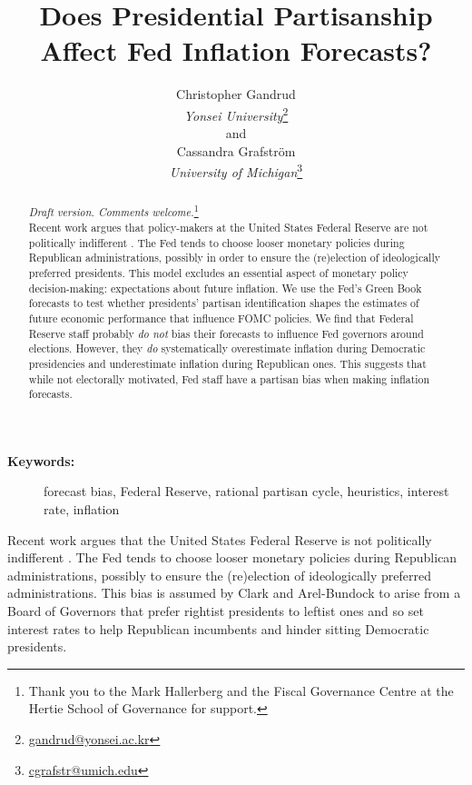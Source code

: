 \documentclass[a4paper]{article}\usepackage{graphicx, color}
\title{Does Presidential Partisanship Affect Fed Inflation Forecasts?}
\author{Christopher Gandrud \\
                {\emph{Yonsei University}}\footnote{\href{mailto:gandrud@yonsei.ac.kr}{gandrud@yonsei.ac.kr}} \\
                and \\
            Cassandra Grafstr\"{o}m \\
                {\emph{University of Michigan}}\footnote{\href{mailto:cgrafstr@umich.edu}{cgrafstr@umich.edu}}}
\begin{document}
\maketitle

\begin{abstract}
\noindent\emph{Draft version. Comments welcome.}\footnote{Thank you to the Mark Hallerberg and the Fiscal Governance Centre at the Hertie School of Governance for support.} \\[0.2cm]

Recent work argues that policy-makers at the United States Federal Reserve are not politically indifferent \citep{Clark2011}. The Fed tends to choose looser monetary policies during Republican administrations, possibly in order to ensure the (re)election of ideologically preferred presidents. This model excludes an essential aspect of monetary policy decision-making: expectations about future inflation. We use the Fed's Green Book forecasts to test whether presidents' partisan identification shapes the estimates of future economic performance that influence FOMC policies. We find that Federal Reserve staff probably {\emph{do not}} bias their forecasts to influence Fed governors around elections. However, they {\emph{do}} systematically overestimate inflation during Democratic presidencies and underestimate inflation during Republican ones. This suggests that while not electorally motivated, Fed staff have a partisan bias when making inflation forecasts.

\end{abstract}

\begin{description}
  \item [{\textbf{Keywords:}}] forecast bias, Federal Reserve, rational partisan cycle, heuristics, interest rate, inflation
\end{description}

\vspace{0.3cm}

Recent work argues that the United States Federal Reserve is not politically indifferent \citep{Clark2011}. The Fed tends to choose looser monetary policies during Republican administrations, possibly to ensure the (re)election of ideologically preferred administrations. This bias is assumed by Clark and Arel-Bundock to arise from a Board of Governors that prefer rightist presidents to leftist ones and so set interest rates to help Republican incumbents and hinder sitting Democratic presidents. 
\end{document}
